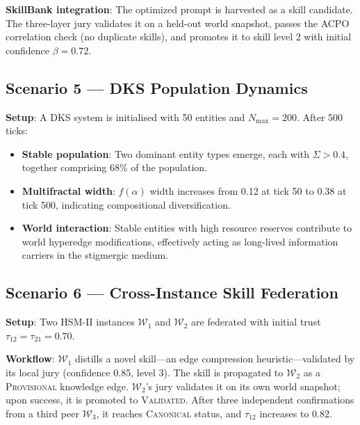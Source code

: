 \documentclass[11pt]{article}
\begin{document}
\noindent\textbf{SkillBank integration}: The optimized prompt is harvested as a
skill candidate. The three-layer jury validates it on a held-out world snapshot,
passes the ACPO correlation check (no duplicate skills), and promotes it to
skill level 2 with initial confidence $\beta = 0.72$.

\subsection{Scenario 5 — DKS Population Dynamics}

\noindent\textbf{Setup}: A DKS system is initialised with 50 entities and
$N_{\text{max}} = 200$. After 500 ticks:

\begin{itemize}[noitemsep,topsep=4pt]
  \item \textbf{Stable population}: Two dominant entity types emerge, each with
        $\Sigma > 0.4$, together comprising 68\% of the population.
  \item \textbf{Multifractal width}: $f(\alpha)$ width increases from 0.12 at
        tick 50 to 0.38 at tick 500, indicating compositional diversification.
  \item \textbf{World interaction}: Stable entities with high resource reserves
        contribute to world hyperedge modifications, effectively acting as
        long-lived information carriers in the stigmergic medium.
\end{itemize}

\subsection{Scenario 6 — Cross-Instance Skill Federation}

\noindent\textbf{Setup}: Two HSM-II instances $\mathcal{W}_1$ and $\mathcal{W}_2$
are federated with initial trust $\tau_{12} = \tau_{21} = 0.70$.

\noindent\textbf{Workflow}: $\mathcal{W}_1$ distills a novel skill---an edge
compression heuristic---validated by its local jury (confidence 0.85, level 3).
The skill is propagated to $\mathcal{W}_2$ as a \textsc{Provisional} knowledge
edge. $\mathcal{W}_2$'s jury validates it on its own world snapshot; upon
success, it is promoted to \textsc{Validated}. After three independent
confirmations from a third peer $\mathcal{W}_3$, it reaches \textsc{Canonical}
status, and $\tau_{12}$ increases to 0.82.

\end{document}
